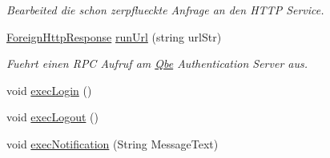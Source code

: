 \begin{CompactItemize}
\begin{CompactList}\small\item\em Bearbeited die schon zerpflueckte Anfrage an den HTTP Service. \item\end{CompactList}\item 
\hyperlink{classQbeSAS_1_1HttpService_1_1ForeignHttpResponse}{Foreign\-Http\-Response} \hyperlink{classQbeSAS_1_1HttpService_QbeSAS_1_1HttpServiced9}{run\-Url} (string url\-Str)
\begin{CompactList}\small\item\em Fuehrt einen RPC Aufruf am \hyperlink{namespaceQbe}{Qbe} Authentication Server aus. \item\end{CompactList}\item 
void \hyperlink{classQbeSAS_1_1HttpService_QbeSAS_1_1HttpServiced10}{exec\-Login} ()
\item 
void \hyperlink{classQbeSAS_1_1HttpService_QbeSAS_1_1HttpServiced11}{exec\-Logout} ()
\item 
void \hyperlink{classQbeSAS_1_1HttpService_QbeSAS_1_1HttpServiced12}{exec\-Notification} (String Message\-Text)
\end{CompactItemize}
